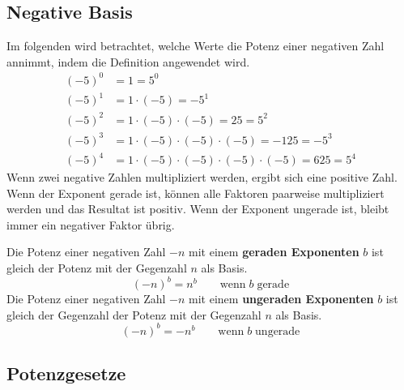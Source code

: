 \newpage
\subsection{Negative Basis}

Im folgenden wird betrachtet, welche Werte die Potenz einer negativen Zahl annimmt, indem die Definition angewendet wird.
\begin{align*}
  (-5)^{0} &= 1 = 5^{0} \\
  (-5)^{1} &= 1\cdot(-5) = -5^{1} \\
  (-5)^{2} &= 1\cdot(-5)\cdot(-5) = 25 = 5^{2} \\
  (-5)^{3} &= 1\cdot(-5)\cdot(-5)\cdot(-5) = -125 = -5^{3} \\
  (-5)^{4} &= 1\cdot(-5)\cdot(-5)\cdot(-5)\cdot(-5) = 625 = 5^{4}
\end{align*}
Wenn zwei negative Zahlen multipliziert werden, ergibt sich eine positive Zahl. Wenn der Exponent gerade ist, können alle Faktoren paarweise multipliziert werden und das Resultat ist positiv. Wenn der Exponent ungerade ist, bleibt immer ein negativer Faktor übrig.
\begin{theorem}
  Die Potenz einer negativen Zahl $-n$ mit einem \textbf{geraden Exponenten} $b$ ist gleich der Potenz mit der Gegenzahl $n$ als Basis.
  \[
    (-n)^{b} = n^{b} \qquad \text{wenn}\;b\;\text{gerade}
  \]
  Die Potenz einer negativen Zahl $-n$ mit einem \textbf{ungeraden Exponenten} $b$ ist gleich der Gegenzahl der Potenz mit der Gegenzahl $n$ als Basis.
  \[
    (-n)^{b} = -n^{b} \qquad \text{wenn}\;b\;\text{ungerade}
  \]
\end{theorem}

\subsection{Potenzgesetze}

